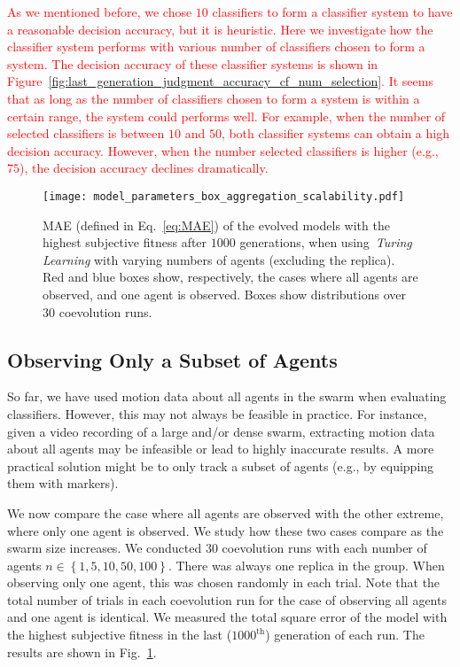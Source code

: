 \textcolor{red}{As we mentioned before, we chose $10$ classifiers to form a classifier system to have a reasonable decision accuracy, but it is heuristic. Here we investigate how the classifier system performs with various number of classifiers chosen to form a system. The decision accuracy of these classifier systems is shown in Figure~\ref{fig:last_generation_judgment_accuracy_cf_num_selection}. It seems that as long as the number of classifiers chosen to form a system is within a certain range, the system could performs well. For example, when the number of selected classifiers is between $10$ and $50$, both classifier systems can obtain a high decision accuracy. However, when the number selected classifiers is higher (e.g., $75$), the decision accuracy declines dramatically.}
%
\begin{figure}[!t]%
	\centering
	\texttt{[image: model\_parameters\_box\_aggregation\_scalability.pdf]}
	\caption{MAE (defined in Eq.~\eqref{eq:MAE}) of the evolved models with the highest subjective fitness after $1000$ generations, when using~\textit{Turing Learning} with varying numbers of agents (excluding the replica). Red and blue boxes show, respectively, the cases where all agents are observed, and one agent is observed. Boxes show distributions over $30$ coevolution runs. }
	\label{fig:model_parameters_box_aggregation_scalability}
\end{figure}
%
\subsection{Observing Only a Subset of Agents}\label{sec:observing_a_subset_agents_swarm_simulation}
So far, we have used motion data about all agents in the swarm when evaluating classifiers. However, this may not always be feasible in practice. For instance, given a video recording of a large and/or dense swarm, extracting motion data about all agents may be infeasible or lead to highly inaccurate results. A more practical solution might be to only track a subset of agents (e.g., by equipping them with markers).

We now compare the case where all agents are observed with the other extreme, where only one agent is observed. We study how these two cases compare as the swarm size increases. We conducted $30$ coevolution runs with each number of agents $n\in\left\{1, 5, 10, 50, 100\right\}$. There was always one replica in the group. When observing only one agent, this was chosen randomly in each trial. Note that the total number of trials in each coevolution run for the case of observing all agents and one agent is identical. We measured the total square error of the model with the highest subjective fitness in the last ($1000^\textrm{th}$) generation of each run. The results are shown in Fig.~\ref{fig:model_parameters_box_aggregation_scalability}.

